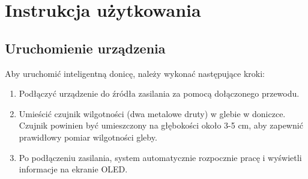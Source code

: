 \documentclass{article}
\begin{document}
\section{Instrukcja użytkowania}

\subsection{Uruchomienie urządzenia}
Aby uruchomić inteligentną donicę, należy wykonać następujące kroki:
\begin{enumerate}
    \item Podłączyć urządzenie do źródła zasilania za pomocą dołączonego przewodu.
    \item Umieścić czujnik wilgotności (dwa metalowe druty) w glebie w doniczce. Czujnik powinien być umieszczony na głębokości około 3-5 cm, aby zapewnić prawidłowy pomiar wilgotności gleby.
    \item Po podłączeniu zasilania, system automatycznie rozpocznie pracę i wyświetli informacje na ekranie OLED.
    
\end{enumerate}
\end{document}
